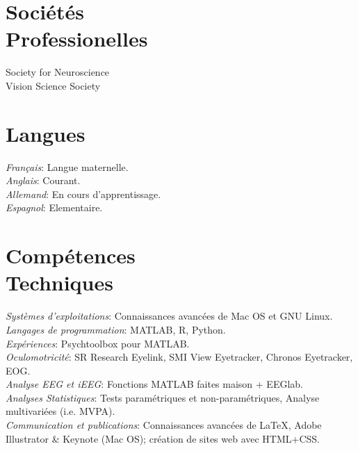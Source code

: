 \documentclass[margin,line]{resume}
\begin{document}
\begin{resume}
\vspace{3mm}
\section{\mysidestyle Sociétés\\Professionelles}
	Society for Neuroscience\\
	Vision Science Society
	
\vspace{3mm}
\section{\mysidestyle Langues}
	\textsl{Français}: Langue maternelle.\\
	\textsl{Anglais}: Courant.\\
	\textsl{Allemand}: En cours d'apprentissage.\\
	\textsl{Espagnol}: Elementaire.

\vspace{3mm}
\section{\mysidestyle Compétences\\Techniques}
	\textsl{Systèmes d'exploitations}: Connaissances avancées de Mac OS et GNU Linux.\\
	\textsl{Langages de programmation}: MATLAB, R, Python.\\
	\textsl{Expériences}: Psychtoolbox pour MATLAB.\\
	\textsl{Oculomotricité}: SR Research Eyelink, SMI View Eyetracker, Chronos Eyetracker, EOG.\\
	\textsl{Analyse EEG et iEEG}: Fonctions MATLAB faites maison + EEGlab.\\
	\textsl{Analyses Statistiques}: Tests paramétriques et non-paramétriques, Analyse multivariées (i.e. MVPA).\\
	\textsl{Communication et publications}: Connaissances avancées de \LaTeX, Adobe Illustrator \& Keynote (Mac OS); création de sites web avec HTML+CSS.


\newpage	

\vspace{3mm}

\end{resume}
\end{document}
